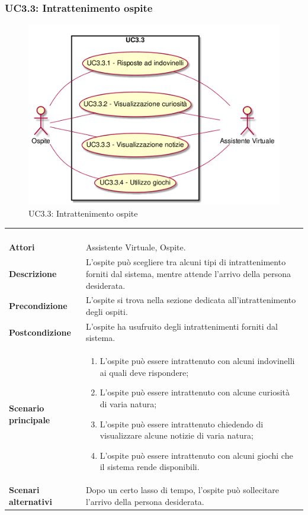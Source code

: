 \newpage\subsubsection{UC3.3: Intrattenimento ospite}
\label{UC3.3}
\begin{figure}[h]
\centering
\includegraphics[width=\textwidth,height=\textheight,keepaspectratio]{images/UseCaseUC33.png}
\caption{UC3.3: Intrattenimento ospite}
\end{figure}
\begin{longtable}{l|p{10cm}}
\rowcolor[gray]{0.8} \multicolumn{2}{c}{} \\
\rowcolor[gray]{0.8} \multicolumn{2}{c}{\textbf{UC3.3 - Intrattenimento ospite}} \\
\rowcolor[gray]{0.8} \multicolumn{2}{c}{} \\
\hline
&\\
\textbf{Attori} & Assistente Virtuale, Ospite.\\[7pt]
\textbf{Descrizione} & L'ospite può scegliere tra alcuni tipi di intrattenimento forniti dal sistema, mentre attende l'arrivo della persona desiderata.\\[7pt]
\textbf{Precondizione} & L'ospite si trova nella sezione dedicata all'intrattenimento degli ospiti.\\[7pt]
\textbf{Postcondizione} & L'ospite ha usufruito degli intrattenimenti forniti dal sistema.\\[7pt]
\textbf{Scenario principale} &\begin{enumerate}
\item  L'ospite può essere intrattenuto con alcuni indovinelli ai quali deve rispondere;
\item  L'ospite può essere intrattenuto con alcune curiosità di varia natura;
\item  L'ospite può essere intrattenuto chiedendo di visualizzare alcune notizie di varia natura;
\item  L'ospite può essere intrattenuto con alcuni giochi che il sistema rende disponibili.
\end{enumerate}
\\[7pt]
\textbf{Scenari alternativi} & Dopo un certo lasso di tempo, l'ospite può sollecitare l'arrivo della persona desiderata.\\[7pt]\hline
\end{longtable}

